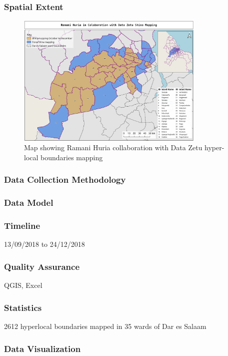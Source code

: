 \documentclass[a4paper,12pt,twoside]{article}
\begin{document}
\subsubsection{Spatial Extent}
\begin{figure}[h]
  \color{RHgreen}\caption{Map showing Ramani Huria collaboration with Data Zetu hyper-local boundaries mapping}
  \centering
  \includegraphics[width=0.8\textwidth]{images/RH_DZ_shina_boundaries.png}
\end{figure}

\subsubsection{Data Collection Methodology}

\subsubsection{Data Model}

\subsubsection{Timeline}
13/09/2018 to 24/12/2018

\subsubsection{Quality Assurance}
QGIS, Excel

\subsubsection{Statistics}
2612 hyperlocal boundaries mapped in 35 wards of Dar es Salaam

\subsubsection{Data Visualization}
\end{document}

